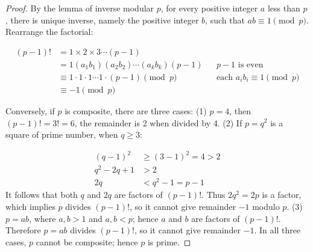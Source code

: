\begin{proof}
By the lemma of inverse modular $p$, for every positive integer $a$ less than $p$, there is unique inverse, namely the positive integer $b$, such that $ab \equiv 1 \pmod p$. Rearrange the factorial:

\begin{align*}
(p - 1)! &= 1 \times 2 \times 3 \dotsm (p - 1)  \\
  &= 1 (a_1 b_1) (a_2 b_2) \dotsm (a_k b_k) (p - 1) && p - 1\text{ is even} \\
  &\equiv 1 \cdot 1 \cdot 1 \dotsm 1 \cdot (p - 1) \pmod p && \text{each } a_ib_i \equiv 1 \pmod p \\
  &\equiv -1 \pmod p
\end{align*}

Conversely, if $p$ is composite, there are three cases: (1) $p = 4$, then $(p - 1)! = 3! = 6$, the remainder is 2 when divided by 4. (2) If $p = q^2$ is a square of prime number, when $q \geq 3$:

\begin{align*}
(q - 1)^2 &\geq (3 - 1)^2 = 4 > 2\\
q^2 - 2q + 1 &> 2 \\
2q &< q^2 - 1 = p - 1
\end{align*}
It follows that both $q$ and $2q$ are factors of $(p-1)!$. Thus $2q^2=2p$ is a factor, which implies $p$ divides $(p-1)!$, so it cannot give remainder $-1$ modulo $p$. (3) $p=ab$, where $a,b>1$ and $a,b<p$; hence $a$ and $b$ are factors of $(p-1)!$. Therefore $p=ab$ divides $(p-1)!$, so it cannot give remainder $-1$. In all three cases, $p$ cannot be composite; hence $p$ is prime.
\end{proof}
